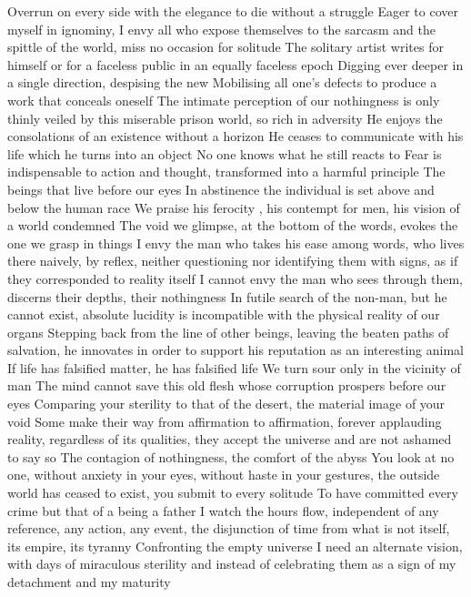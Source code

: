 \documentclass{article}
\begin{document}
Overrun on every side with the elegance to die without a struggle
Eager to cover myself in ignominy, I envy all who expose themselves to the sarcasm and the spittle of the world, miss no occasion for solitude
The solitary artist writes for himself or for a faceless public in an equally faceless epoch
Digging ever deeper in a single direction, despising the new
Mobilising all one's defects to produce a work that conceals oneself
The intimate perception of our nothingness is only thinly veiled by this miserable prison world, so rich in adversity
He enjoys the consolations of an existence without a horizon
He ceases to communicate with his life which he turns into an object
No one knows what he still reacts to
Fear is indispensable  to action and thought, transformed into a harmful principle
The beings that live before our eyes
In abstinence the individual is set above and below the human race
We praise his ferocity , his contempt for men, his vision of a world condemned
The void we glimpse, at the bottom of the words, evokes the one we grasp in things
I envy the man who takes his ease among words, who lives there naively, by reflex, neither questioning nor identifying them with signs, as if they corresponded to reality itself
I cannot envy the man who sees through them, discerns their depths, their nothingness
In futile search of the non-man, but he cannot exist, absolute lucidity is incompatible with the physical reality of our organs
Stepping back from the line of other beings, leaving the beaten paths of salvation, he innovates in order to support his reputation as an interesting animal
If life has falsified matter, he has falsified life
We turn sour only in the vicinity of man
The mind cannot save this old flesh whose corruption prospers before our eyes
Comparing your sterility to that of the desert, the material image of your void
Some make their way from affirmation to affirmation, forever applauding reality, regardless of its qualities, they accept the universe and are not ashamed to say so
The contagion of nothingness, the comfort of the abyss
You look at no one, without anxiety in your eyes, without haste in your gestures, the outside world has ceased to exist, you submit to every solitude
To have committed every crime but that of a being a father
I watch the hours flow, independent of any reference, any action, any event, the disjunction of time from what is not itself, its empire, its tyranny
Confronting the empty universe
I need an alternate vision, with days of miraculous sterility and instead of celebrating them as a sign of my detachment and my maturity
\end{document}
